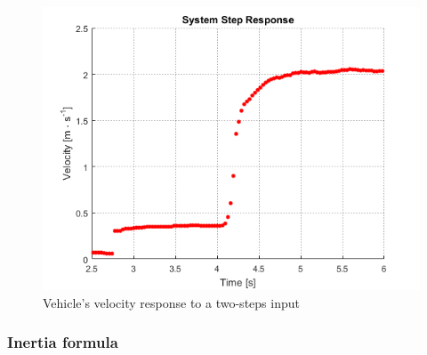 \begin{figure}[H]
  \centering
  \includegraphics[scale=0.8]{figures/VehicleMomentOfInertiaTest.png}
  \caption{Vehicle's velocity response to a two-steps input}
  \label{fig:MomentOfInertiaTestPlot}
\end{figure}\vspace{-5mm}

\subsubsection{Inertia formula}

